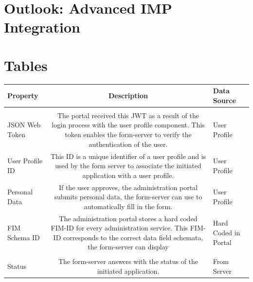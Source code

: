 \documentclass[
     12pt,         %
     a4paper,      %
     BCOR=10mm,version=first,     %
     DIV=14,version=first,        %
     ]{scrreprt}
\begin{document}
\chapter{Outlook: Advanced IMP Integration}

\chapter{Tables}

        \begin{table}[!h]
            \begin{tabularx}{\textwidth}{|l|C|l|}
            \hline
            Property & Description & Data Source \\
            \hline
             \\
            \hline
            
            JSON Web Token & The portal received this JWT as a result of the login process with the user profile component. This token enables the form-server to verify the authentication of the user. & User Profile \\
            
            \hline
            
            User Profile ID & This ID is a unique identifier of a user profile and is used by the form server to associate the initiated application with a user profile. & User Profile \\
            
            \hline
            
            Personal Data & If the user approves, the administration portal submits personal data, the form-server can use to automatically fill in the form. & User Profile \\
            
            \hline
            
            FIM Schema ID & The administration portal stores a hard coded FIM-ID for every administration service. This FIM-ID corresponds to the correct data field schemata, the form-server can display & Hard Coded in Portal \\
            
            \hline
             \\
            \hline
            
            Status & The form-server answers with the status of the initiated application. & From Server \\
            

\end{tabularx}
\end{table}
\end{document}
